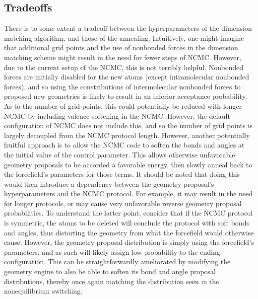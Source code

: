 \subsection{Tradeoffs}
%
There is to some extent a tradeoff between the hyperparameters of the dimension matching algorithm, and those of the annealing.
%
Intuitively, one might imagine that additional grid points and the use of nonbonded forces in the dimension matching scheme might result in the need for fewer steps of NCMC.
%
However, due to the current setup of the NCMC, this is not terribly helpful.
%
Nonbonded forces are initially disabled for the new atoms (except intramolecular nonbonded forces), and so using the constributions of intermolecular nonbonded forces to proposed new geometries is likely to result in an inferior acceptance probability.
%
As to the number of grid points, this could potentially be reduced with longer NCMC by including valence softening in the NCMC.
%
However, the default configuration of NCMC does not include this, and so the number of grid points is largely decoupled from the NCMC protocol length.
%
However, another potentially fruitful approach is to allow the NCMC code to soften the bonds and angles at the initial value of the control parameter.
%
This allows otherwise unfavorable geometry proposals to be accorded a favorable energy, then slowly anneal back to the forcefield's parameters for those terms.
%
It should be noted that doing this would then introduce a dependency between the geometry proposal's hyperparameters and the NCMC protocol.
%
For example, it may result in the need for longer protocols, or may cause very unfavorable reverse geometry proposal probabilities.
%
To understand the latter point, consider that if the NCMC protocol is symmetric, the atoms to be deleted will conclude the protocol with soft bonds and angles, thus distorting the geometry from what the forcefield would otherwise cause.
%
However, the geometry proposal distribution is simply using the forcefield's parameters, and as such will likely assign low probability to the ending configuration.
%
This can be straightforwardly ameliorated by modifying the geometry engine to also be able to soften its bond and angle proposal distributions, thereby once again matching the distribution seen in the nonequilibrium switching.

